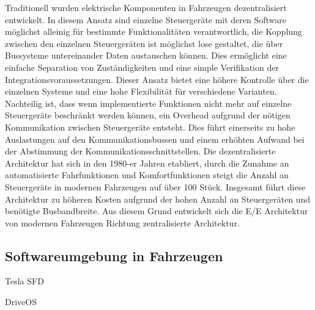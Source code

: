 Traditionell wurden elektrische Komponenten in Fahrzeugen dezentralisiert entwickelt. In diesem Ansatz sind einzelne Steuergeräte mit deren Software möglichst alleinig für bestimmte Funktionalitäten verantwortlich, die Kopplung zwischen den einzelnen Steuergeräten ist möglichst lose gestaltet, die über Bussysteme untereinander Daten austauschen können. Dies ermöglicht eine einfache Separation von Zuständigkeiten und eine simple Verifikation der Integrationsvoraussetzungen. \cite{DiNatale2010} Dieser Ansatz bietet eine höhere Kontrolle über die einzelnen Systeme und eine hohe Flexibilität für verschiedene Varianten. Nachteilig ist, dass wenn implementierte Funktionen nicht mehr auf einzelne Steuergeräte beschränkt werden können, ein Overhead aufgrund der nötigen Kommunikation zwischen Steuergeräte entsteht. Dies führt einerseits zu hohe Auslastungen auf den Kommunikationsbussen und einem erhöhten Aufwand bei der Abstimmung der Kommunikationsschnittstellen. \cite{Reinhardt2013} Die dezentralisierte Architektur hat sich in den 1980-er Jahren etabliert, durch die Zunahme an automatisierte Fahrfunktionen und Komfortfunktionen steigt die Anzahl an Steuergeräte in modernen Fahrzeugen auf über 100 Stück. \cite{Amend2017} Insgesamt führt diese Architektur zu höheren Kosten aufgrund der hohen Anzahl an Steuergeräten und benötigte Busbandbreite. Aus diesem Grund entwickelt sich die E/E Architektur von modernen Fahrzeugen Richtung zentralisierte Architektur. 

 



\subsection{Softwareumgebung in Fahrzeugen}

Tesla SFD\cite{Talpes2020}

DriveOS \cite{Sinha2021}